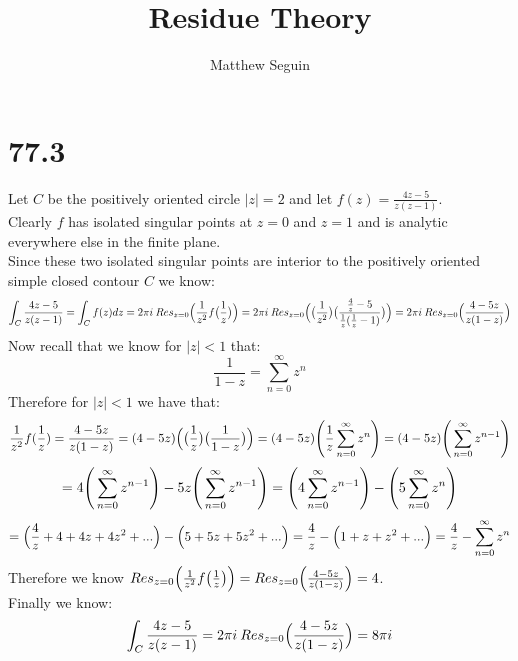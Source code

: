 \documentclass{article}
\title{Residue Theory}
\author{Matthew Seguin}
\date{}
\begin{document}
\maketitle

\section*{77.3}
\begin{center}
    \doublespacing
    Let $C$ be the positively oriented circle $|z| = 2$ and let $f(z) =\frac{4z - 5}{z(z - 1)}$.
    \\Clearly $f$ has isolated singular points at $z = 0$ and $z = 1$ and is analytic everywhere else in the finite plane.
    \\Since these two isolated singular points are interior to the positively oriented simple closed contour $C$ we know:
    \[\int _C\frac{4z - 5}{z(z - 1)} =\int _C f(z) dz = 2\pi i\:Res _{z=0}\Big{(}\frac{1}{z^2} f\big{(}\frac{1}{z}\big{)}\Big{)} = 2\pi i\:Res _{z=0}\Big{(}\big{(}\frac{1}{z^2}\big{)}\big{(}\frac{\frac{4}{z} - 5}{\frac{1}{z}(\frac{1}{z} - 1)}\big{)}\Big{)} = 2\pi i\:Res _{z=0}\Big{(}\frac{4 - 5z}{z(1 - z)}\Big{)}\]
    Now recall that we know for $|z| < 1$ that:
    \[\frac{1}{1 - z} =\sum _{n=0}^{\infty} z^n\]
    Therefore for $|z| < 1$ we have that:
    \[\frac{1}{z^2} f(\frac{1}{z}) =\frac{4 - 5z}{z(1 - z)} = (4 - 5z)\Big{(}\big{(}\frac{1}{z}\big{)}\big{(}\frac{1}{1 - z}\big{)}\Big{)} = (4 - 5z)\Bigg{(}\frac{1}{z}\sum _{n=0}^{\infty} z^n\Bigg{)} = (4 - 5z)\Bigg{(}\sum _{n=0}^{\infty} z^{n-1}\Bigg{)}\]
    \[= 4\Bigg{(}\sum _{n=0}^{\infty} z^{n-1}\Bigg{)} - 5z\Bigg{(}\sum _{n=0}^{\infty} z^{n-1}\Bigg{)} =\Bigg{(}4\sum _{n=0}^{\infty} z^{n-1}\Bigg{)} -\Bigg{(}5\sum _{n=0}^{\infty} z^{n}\Bigg{)}\]
    \[=\Big{(}\frac{4}{z} + 4 + 4z + 4z^2 + ...\Big{)} -\Big{(}5 + 5z + 5z^2 + ...\Big{)} =\frac{4}{z} -\Big{(}1 + z + z^2 + ...\Big{)} =\frac{4}{z} -\sum _{n=0}^{\infty} z^n\]
    Therefore we know $Res _{z=0}\Big{(}\frac{1}{z^2} f\big{(}\frac{1}{z}\big{)}\Big{)} = Res _{z=0}\Big{(}\frac{4 - 5z}{z(1 - z)}\Big{)} = 4$.
    \\Finally we know:
    \[\int _C\frac{4z - 5}{z(z - 1)} = 2\pi i\:Res _{z=0}\Big{(}\frac{4 - 5z}{z(1 - z)}\Big{)} = 8\pi i\]
    \qedsymbol
\end{center}


\newpage
\end{document}
